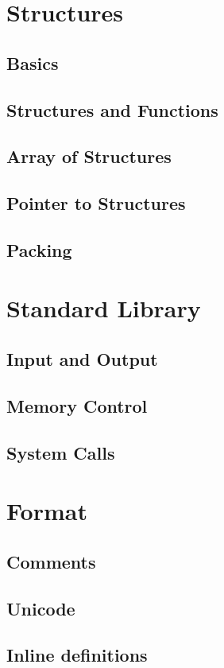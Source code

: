 \documentclass{scrartcl}
\begin{document}
    \section{Structures}
        \subsection{Basics}
        \subsection{Structures and Functions}
        \subsection{Array of Structures}
        \subsection{Pointer to Structures}
        \subsection{Packing}
    \section{Standard Library}
        \subsection{Input and Output}
        \subsection{Memory Control}
        \subsection{System Calls}
    \section{Format}
        \subsection{Comments}
        \subsection{Unicode}
        \subsection{Inline definitions}
\end{document}
